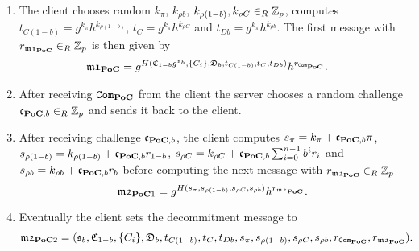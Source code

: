 \begin{enumerate}
  \item %
    The client chooses random $k_{\pi}$, $k_{\rho b}$, $k_{\rho (1-b)}, k_{\rho C}\in_R\mathbb{Z}_p$, computes $t_{C(1-b)}=g^{k_{\pi}}h^{k_{\rho (1-b)}}$, $t_{C}=g^{k_\pi}h^{k_{\rho C}}$ and $t_{Db}=g^{k_{\pi}}h^{k_{\rho b}}$.
    The first message with $r_{\mathfrak{m1}_{\mathsf{\bf PoC}}}\in_R\mathbb{Z}_p$ is then given by
    \begin{align*}      
    & \mathfrak{m1}_{\mathsf{\bf PoC}}=g^{H(\mathfrak{C}_{1-b}g^{\mathfrak{s}_b}, \{C_i\}, \mathfrak{D}_b, t_{C(1-b)}, t_C, t_{Db})} h^{r_{\mathtt{Com}_{\mathsf{\bf PoC}}}}.
    \end{align*}

  \item %
    After receiving $\mathtt{Com}_{\mathsf{\bf PoC}}$ from the client the server chooses a random challenge $\mathfrak{c}_{\mathsf{\bf PoC},b}\in_R\mathbb{Z}_p$ and sends it back to the client.

  \item %
    After receiving challenge $\mathfrak{c}_{\mathsf{\bf PoC}, b}$, the client computes $s_{\pi}=k_{\pi}+\mathfrak{c}_{\mathsf{\bf PoC},b}\pi$, $s_{\rho (1-b)}=k_{\rho{(1-b)}}+\mathfrak{c}_{\mathsf{\bf PoC},b}r_{1-b}$, $s_{\rho C}=k_{\rho C} + \mathfrak{c}_{\mathsf{\bf PoC},b} \sum_{i=0}^{n-1}b^i r_i$ and $s_{\rho b}=k_{\rho{b}}+\mathfrak{c}_{\mathsf{\bf PoC},b}r_{b}$ before computing the next message with $r_{\mathfrak{m2}_{\mathsf{\bf PoC}}}\in_R\mathbb{Z}_p$
    \[\mathfrak{m2}_{\mathsf{\bf PoC}1}=g^{H(s_{\pi}, s_{\rho (1-b)}, s_{\rho C}, s_{\rho b})} h^{r_{\mathfrak{m2}_{\mathsf{\bf PoC}}}}.\]

  \item %
    Eventually the client sets the decommitment message to
    \begin{align*}
    & \mathfrak{m2}_{\mathsf{\bf PoC}2}=(\mathfrak{s}_b, \mathfrak{C}_{1-b}, \{C_i\}, \mathfrak{D}_b, t_{C(1-b)}, t_C, t_{Db}, s_{\pi}, s_{\rho (1-b)}, s_{\rho C}, s_{\rho b}, r_{\mathtt{Com}_{\mathsf{\bf PoC}}}, r_{\mathfrak{m2}_{\mathsf{\bf PoC}}}).
    \end{align*}
\end{enumerate}

